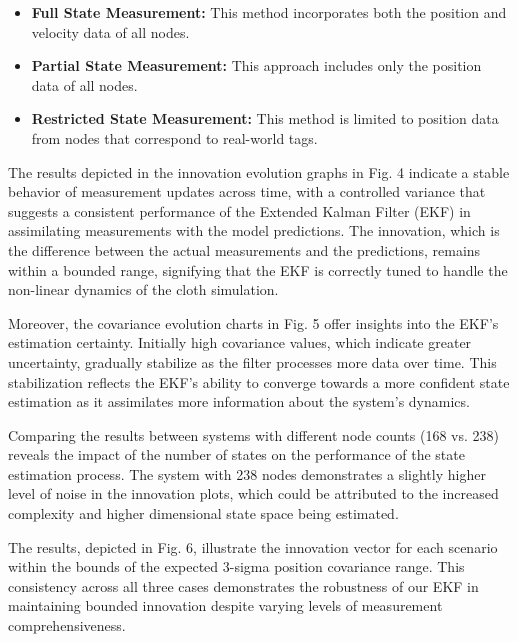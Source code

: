 \documentclass[subscriptcorrection,upint,varvw,barcolor=Goldenrod3,mathalfa=cal=euler,balance,hyphenate,french,pdf-a, nofoot]{asmejour} %
\begin{document}
\begin{itemize}
    \item \textbf{Full State Measurement:} This method incorporates both the position and velocity data of all nodes.
    \item \textbf{Partial State Measurement:} This approach includes only the position data of all nodes.
    \item \textbf{Restricted State Measurement:} This method is limited to position data from nodes that correspond to real-world tags.
\end{itemize}

The results depicted in the innovation evolution graphs in Fig. 4 indicate a stable behavior of measurement updates across time, with a controlled variance that suggests a consistent performance of the Extended Kalman Filter (EKF) in assimilating measurements with the model predictions. The innovation, which is the difference between the actual measurements and the predictions, remains within a bounded range, signifying that the EKF is correctly tuned to handle the non-linear dynamics of the cloth simulation.

Moreover, the covariance evolution charts in Fig. 5 offer insights into the EKF's estimation certainty. Initially high covariance values, which indicate greater uncertainty, gradually stabilize as the filter processes more data over time. This stabilization reflects the EKF's ability to converge towards a more confident state estimation as it assimilates more information about the system's dynamics.

Comparing the results between systems with different node counts (168 vs. 238) reveals the impact of the number of states on the performance of the state estimation process. The system with 238 nodes demonstrates a slightly higher level of noise in the innovation plots, which could be attributed to the increased complexity and higher dimensional state space being estimated.

The results, depicted in Fig. 6, illustrate the innovation vector for each scenario within the bounds of the expected 3-sigma position covariance range. This consistency across all three cases demonstrates the robustness of our EKF in maintaining bounded innovation despite varying levels of measurement comprehensiveness.


\end{document}
